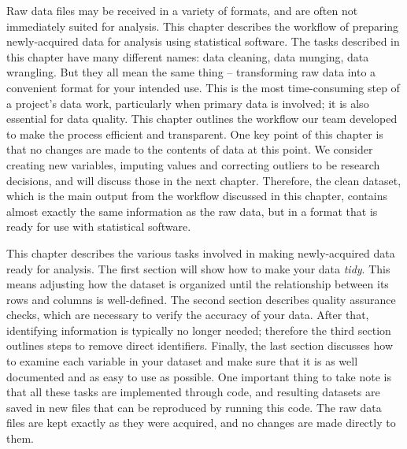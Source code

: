 
\begin{fullwidth}

Raw data files may be received in a variety of formats,
and are often not immediately suited for analysis.
This chapter describes the workflow of preparing newly-acquired data for analysis
using statistical software.
The tasks described in this chapter have many different names:
data cleaning, data munging, data wrangling.
But they all mean the same thing --
transforming raw data into a convenient format for your intended use.
This is the most time-consuming step of a project's data work,
particularly when primary data is involved;
it is also essential for data quality.
This chapter outlines the workflow our team developed to make the process efficient and transparent.
One key point of this chapter is that no changes are made to the contents of data at this point.
We consider creating new variables, imputing values and correcting outliers
to be research decisions, and will discuss those in the next chapter.
Therefore, the clean dataset,
which is the main output from the workflow discussed in this chapter,
contains almost exactly the same information as the raw data,
but in a format that is ready for use with statistical software.

This chapter describes the various tasks involved in making newly-acquired data ready for analysis.
The first section will show how to make your data \textit{tidy}.
This means adjusting how the dataset is organized
until the relationship between its rows and columns is well-defined.
The second section describes quality assurance checks,
which are necessary to verify the accuracy of your data.
After that, identifying information is typically no longer needed;
therefore the third section outlines steps to remove direct identifiers.
Finally, the last section discusses how to examine each variable in your dataset and
make sure that it is as well documented and as easy to use as possible.
One important thing to take note is that all these tasks are implemented through code,
and resulting datasets are saved in new files that can be reproduced by running this code.
The raw data files are kept exactly as they were acquired,
and no changes are made directly to them.

\end{fullwidth}



